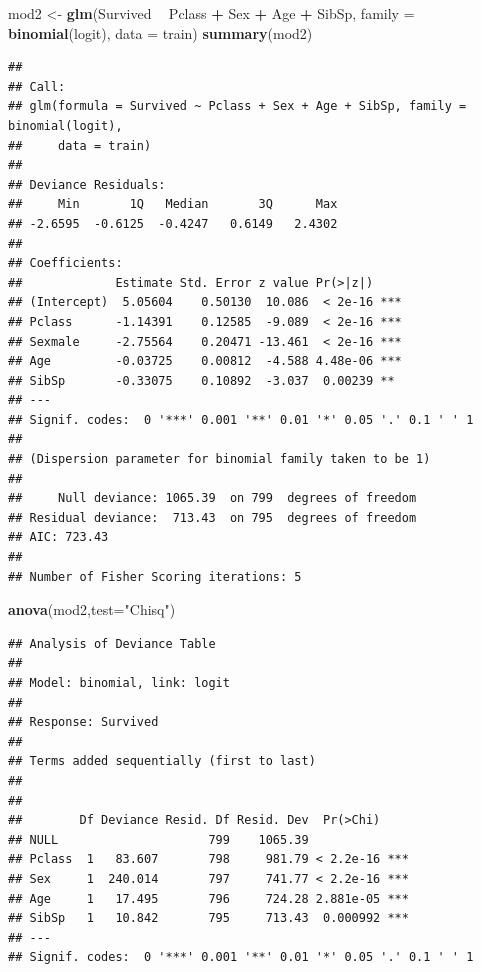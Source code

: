 \documentclass[]{book}
\newenvironment{Shaded}{\begin{snugshade}}{\end{snugshade}}
\newcommand{\KeywordTok}[1]{\textcolor[rgb]{0.13,0.29,0.53}{\textbf{#1}}}
\newcommand{\DataTypeTok}[1]{\textcolor[rgb]{0.13,0.29,0.53}{#1}}
\newcommand{\StringTok}[1]{\textcolor[rgb]{0.31,0.60,0.02}{#1}}
\newcommand{\OperatorTok}[1]{\textcolor[rgb]{0.81,0.36,0.00}{\textbf{#1}}}
\newcommand{\NormalTok}[1]{#1}
\begin{document}
\begin{Shaded}
\begin{Highlighting}[]
\NormalTok{mod2 <-}\StringTok{ }\KeywordTok{glm}\NormalTok{(Survived }\OperatorTok{~}\StringTok{ }\NormalTok{Pclass }\OperatorTok{+}\StringTok{ }\NormalTok{Sex  }\OperatorTok{+}\StringTok{ }\NormalTok{Age }\OperatorTok{+}\StringTok{ }\NormalTok{SibSp, }\DataTypeTok{family =} \KeywordTok{binomial}\NormalTok{(logit), }\DataTypeTok{data =}\NormalTok{ train)}
\KeywordTok{summary}\NormalTok{(mod2)}
\end{Highlighting}
\end{Shaded}

\begin{verbatim}
## 
## Call:
## glm(formula = Survived ~ Pclass + Sex + Age + SibSp, family = binomial(logit), 
##     data = train)
## 
## Deviance Residuals: 
##     Min       1Q   Median       3Q      Max  
## -2.6595  -0.6125  -0.4247   0.6149   2.4302  
## 
## Coefficients:
##             Estimate Std. Error z value Pr(>|z|)    
## (Intercept)  5.05604    0.50130  10.086  < 2e-16 ***
## Pclass      -1.14391    0.12585  -9.089  < 2e-16 ***
## Sexmale     -2.75564    0.20471 -13.461  < 2e-16 ***
## Age         -0.03725    0.00812  -4.588 4.48e-06 ***
## SibSp       -0.33075    0.10892  -3.037  0.00239 ** 
## ---
## Signif. codes:  0 '***' 0.001 '**' 0.01 '*' 0.05 '.' 0.1 ' ' 1
## 
## (Dispersion parameter for binomial family taken to be 1)
## 
##     Null deviance: 1065.39  on 799  degrees of freedom
## Residual deviance:  713.43  on 795  degrees of freedom
## AIC: 723.43
## 
## Number of Fisher Scoring iterations: 5
\end{verbatim}

\begin{Shaded}
\begin{Highlighting}[]
\KeywordTok{anova}\NormalTok{(mod2,}\DataTypeTok{test=}\StringTok{"Chisq"}\NormalTok{)}
\end{Highlighting}
\end{Shaded}

\begin{verbatim}
## Analysis of Deviance Table
## 
## Model: binomial, link: logit
## 
## Response: Survived
## 
## Terms added sequentially (first to last)
## 
## 
##        Df Deviance Resid. Df Resid. Dev  Pr(>Chi)    
## NULL                     799    1065.39              
## Pclass  1   83.607       798     981.79 < 2.2e-16 ***
## Sex     1  240.014       797     741.77 < 2.2e-16 ***
## Age     1   17.495       796     724.28 2.881e-05 ***
## SibSp   1   10.842       795     713.43  0.000992 ***
## ---
## Signif. codes:  0 '***' 0.001 '**' 0.01 '*' 0.05 '.' 0.1 ' ' 1
\end{verbatim}
\end{document}
